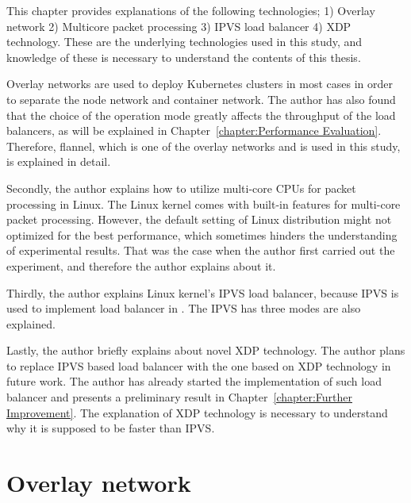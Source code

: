 

  This chapter provides explanations of the following technologies;
  1) Overlay network
  2) Multicore packet processing
  3) IPVS load balancer
  4) XDP technology.
  These are the underlying technologies used in this study, and knowledge of these is necessary to understand the contents of this thesis.





Overlay networks are used to deploy Kubernetes clusters in most cases in order to separate the node network and container network.
The author has also found that the choice of the operation mode  greatly affects the throughput of the load balancers, as will be explained in Chapter~\ref{chapter:Performance Evaluation}.
Therefore, flannel, which is one of the overlay networks and is used in this study, is explained in detail.

Secondly, the author explains how to utilize multi-core CPUs for packet processing in Linux.
The Linux kernel comes with built-in features for multi-core packet processing.
However, the default setting of Linux distribution might not  optimized for the best performance, which sometimes hinders the understanding of experimental results.
That was the case when the author first carried out the experiment, and therefore the author explains about it.

Thirdly, the author explains Linux kernel's IPVS load balancer, because IPVS is used to implement  load balancer in .
The IPVS has three  modes are also explained.

Lastly, the author briefly explains about novel XDP technology.
The author plans to replace IPVS based load balancer with the one based on XDP technology in future work.
The author has already started the implementation of such load balancer and presents a preliminary result in Chapter~\ref{chapter:Further Improvement}.
The explanation of XDP technology is necessary to understand why it is supposed to be faster than IPVS.


\section{Overlay network}


